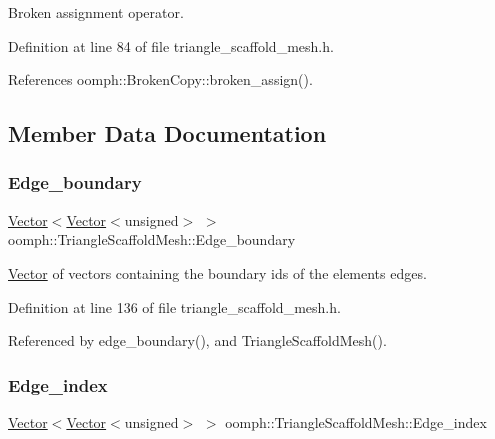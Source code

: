 Broken assignment operator. 



Definition at line 84 of file triangle\+\_\+scaffold\+\_\+mesh.\+h.



References oomph\+::\+Broken\+Copy\+::broken\+\_\+assign().



\subsection{Member Data Documentation}
\mbox{\label{classoomph_1_1TriangleScaffoldMesh_aaf277ebb4f0d73ab9f4211884b5cbf7c}} 
\subsubsection{\texorpdfstring{Edge\+\_\+boundary}{Edge\_boundary}}
{\footnotesize\ttfamily \hyperlink{classoomph_1_1Vector}{Vector}$<$\hyperlink{classoomph_1_1Vector}{Vector}$<$unsigned$>$ $>$ oomph\+::\+Triangle\+Scaffold\+Mesh\+::\+Edge\+\_\+boundary\hspace{0.3cm}{\ttfamily [protected]}}



\hyperlink{classoomph_1_1Vector}{Vector} of vectors containing the boundary ids of the elements\textquotesingle{} edges. 



Definition at line 136 of file triangle\+\_\+scaffold\+\_\+mesh.\+h.



Referenced by edge\+\_\+boundary(), and Triangle\+Scaffold\+Mesh().

\mbox{\label{classoomph_1_1TriangleScaffoldMesh_af3a887e26d82342a8cf6d45ef2eb2f79}} 
\subsubsection{\texorpdfstring{Edge\+\_\+index}{Edge\_index}}
{\footnotesize\ttfamily \hyperlink{classoomph_1_1Vector}{Vector}$<$\hyperlink{classoomph_1_1Vector}{Vector}$<$unsigned$>$ $>$ oomph\+::\+Triangle\+Scaffold\+Mesh\+::\+Edge\+\_\+index\hspace{0.3cm}{\ttfamily [protected]}}



